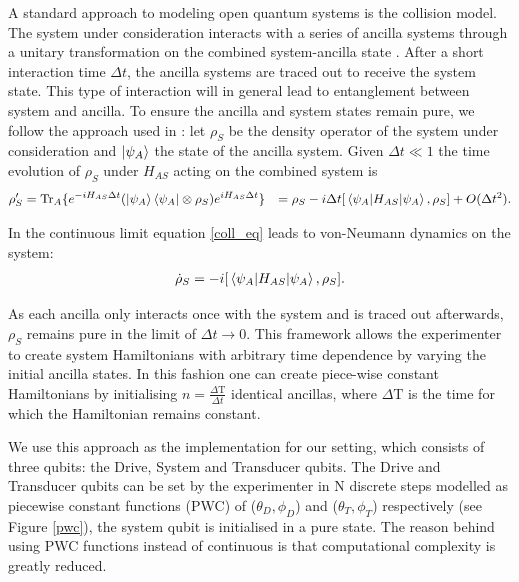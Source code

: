 A standard approach to modeling open quantum systems is the collision model.
The system under consideration interacts with a series of ancilla systems through a unitary transformation on the combined system-ancilla state \cite{Lorenzo_2017}. After a short interaction time $\Delta t$, the ancilla systems are traced out to receive the system state.
This type of interaction will in general lead to entanglement between system and ancilla.
To ensure the ancilla and system states remain pure, we follow the approach used in \cite{beyer2020}:
let $\rho_S$ be the density operator of the system under consideration and $\ket{\psi_A}$ the state of the ancilla system.
Given $\Delta t \ll 1$ the time evolution of $\rho_S$ under $H_{AS}$ acting on the combined system is
\begin{align}\label{coll_eq}
\rho'_S & = \mathrm{Tr}_A \{ e^{-i H_{AS} \Delta t} (\ket{\psi_A} \bra{\psi_A} \otimes \rho_S) e^{i H_{AS} \Delta t} \} & = \rho_S - i \Delta t [\expval{H_{AS}}{\psi_A}, \rho_S] + O(\Delta t^2).
\end{align}

In the continuous limit equation \ref{coll_eq} leads to von-Neumann dynamics on the system:
\begin{align*}
	\dot{\rho}_S = - i [\expval{H_{AS}}{\psi_A}, \rho_S].
\end{align*}

As each ancilla only interacts once with the system and is traced out afterwards, $\rho_S$ remains pure in the limit of $\Delta t \to 0$.
This framework allows the experimenter to create system Hamiltonians with arbitrary time dependence by varying the initial ancilla states.
In this fashion one can create piece-wise constant Hamiltonians by initialising $n = \frac{\Delta \mathrm{T}}{\Delta t}$ identical ancillas, where $\Delta \mathrm{T}$ is the time for which the Hamiltonian remains constant.

We use this approach as the implementation for our setting, which consists of three qubits: the Drive, System and Transducer qubits. The Drive and Transducer qubits can be set by the experimenter in N discrete steps modelled as piecewise constant functions (PWC) of ($\theta_D, \phi_D$) and ($\theta_T, \phi_T$) respectively (see Figure \ref{pwc}), the system qubit is initialised in a pure state.
The reason behind using PWC functions instead of continuous is that computational complexity is greatly reduced.

